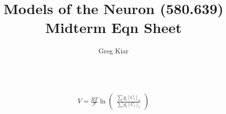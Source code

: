 \documentclass[10pt]{article}
\newcommand{\p}{\begin{pmatrix}}
\newcommand{\pp}{\end{pmatrix}}
\begin{document}
\title{ \vspace{-50mm} Models of the Neuron (580.639) Midterm Eqn Sheet}
\author{Greg Kiar}

\vspace{-90mm}
\begin{enumerate}



\begin{align*}
\\ \\ \\ 
V = \frac{RT}{\mathscr{F}} \ln \p \frac{\sum g_i [C_i]_o}{\sum g_i [C_i]_i} \pp
\end{align*}


\end{enumerate}
\end{document}
